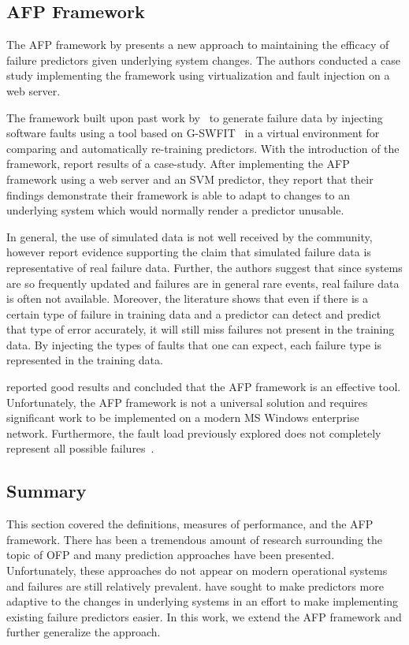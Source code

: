 \subsection{\ac{AFP} Framework} \label{afp}
The \ac{AFP} framework by \citet{irrera2015} presents a new approach to
maintaining the efficacy of failure predictors given underlying system changes.
The authors conducted a case study implementing the framework using
virtualization and fault injection on a web server.  

The framework built upon past work by~\citet{irrera2013,irrera2014} to generate
failure data by injecting software faults using a tool based on
\ac{G-SWFIT}~\citep{gswfit} in a virtual environment for comparing and
automatically re-training predictors.  With the introduction of the framework,
\citet{irrera2015} report results of a case-study.  After implementing the
\ac{AFP} framework using a web server and an \ac{SVM} predictor, they report
that their findings demonstrate their framework is able to adapt to changes to
an underlying system which would normally render a predictor unusable.

In general, the use of simulated data is not well received by the community,
however \citet{irrera2010,irrera2014} report evidence supporting the claim that
simulated failure data is representative of real failure data.  Further, the
authors suggest that since systems are so frequently updated and failures are
in general rare events, real failure data is often not available.  Moreover,
the literature shows that even if there is a certain type of failure in
training data and a predictor can detect and predict that type of error
accurately, it will still miss failures not present in the training data.  By
injecting the types of faults that one can expect, each failure type is
represented in the training data.

\citet{irrera2015} reported good results and concluded that the \ac{AFP}
framework is an effective tool.  Unfortunately, the \ac{AFP} framework is not a
universal solution and requires significant work to be implemented on a modern
\ac{MS} Windows enterprise network.  Furthermore, the fault load previously
explored does not completely represent all possible
failures~\citep{kikuchi2014}.

\subsection{Summary} \label{summary}
This section covered the definitions, measures of performance, and the \ac{AFP}
framework.  There has been a tremendous amount of research surrounding the
topic of \ac{OFP} and many prediction approaches have been presented.
Unfortunately, these approaches do not appear on modern operational systems and
failures are still relatively prevalent.  \citet{irrera2015} have sought to
make predictors more adaptive to the changes in underlying systems in an effort
to make implementing existing failure predictors easier.  In this work, we
extend the \ac{AFP} framework and further generalize the approach.  
